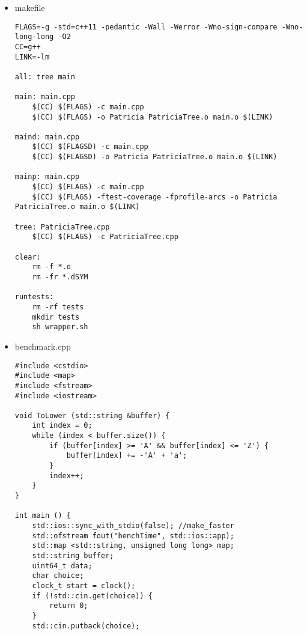 \documentclass[pdf, unicode, 12pt, a4paper,oneside,fleqn]{article}
\begin{document}
\begin{itemize}
\begin{lstlisting}
                elif action == "!":
                    act_file = random.choice(acts_file)
                    if act_file == "Save test":
                        output_file.write("{0} {1}\n".format( action, act_file ))
                        save_file = keys.copy()
                        answer = "OK"
                    elif act_file == "Load test":
                        output_file.write("{0} {1}\n".format( action, act_file ))
                        keys = {}
                        keys = save_file.copy()
                        answer = "OK"
                    answer_file.write( "{0}\n".format( answer ) )
\end{lstlisting}
\lstset{language=BASH}
\item makefile
\begin{lstlisting}
FLAGS=-g -std=c++11 -pedantic -Wall -Werror -Wno-sign-compare -Wno-long-long -O2
CC=g++
LINK=-lm

all: tree main

main: main.cpp
	$(CC) $(FLAGS) -c main.cpp
	$(CC) $(FLAGS) -o Patricia PatriciaTree.o main.o $(LINK)

maind: main.cpp
	$(CC) $(FLAGSD) -c main.cpp
	$(CC) $(FLAGSD) -o Patricia PatriciaTree.o main.o $(LINK)

mainp: main.cpp
	$(CC) $(FLAGS) -c main.cpp
	$(CC) $(FLAGS) -ftest-coverage -fprofile-arcs -o Patricia PatriciaTree.o main.o $(LINK)

tree: PatriciaTree.cpp
	$(CC) $(FLAGS) -c PatriciaTree.cpp

clear:
	rm -f *.o
	rm -fr *.dSYM

runtests:
	rm -rf tests
	mkdir tests
	sh wrapper.sh

\end{lstlisting}
\item benchmark.cpp
\lstset{language=C}
\begin{lstlisting}
#include <cstdio>
#include <map>
#include <fstream>
#include <iostream>

void ToLower (std::string &buffer) {
    int index = 0;
    while (index < buffer.size()) {
        if (buffer[index] >= 'A' && buffer[index] <= 'Z') {
            buffer[index] += -'A' + 'a';
        }
        index++;
    }
}

int main () {
    std::ios::sync_with_stdio(false); //make_faster
    std::ofstream fout("benchTime", std::ios::app);
    std::map <std::string, unsigned long long> map;
    std::string buffer;
    uint64_t data;
    char choice;
    clock_t start = clock();
    if (!std::cin.get(choice)) {
        return 0;
    }
    std::cin.putback(choice);


\end{lstlisting}
\end{itemize}
\end{document}
